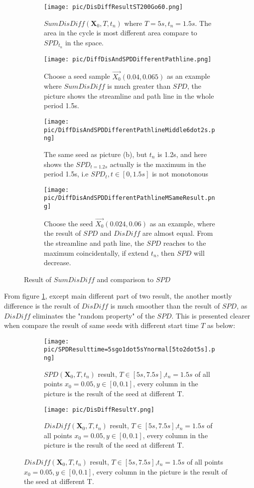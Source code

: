 \documentclass[
     11pt,         %
     a4paper,      %
     oneside,
     ]{article}
\newcommand{\vect}[1]{\boldsymbol{#1}}
\begin{document}
\begin{figure}[H]
	\centering
	\begin{subfigure}{0.65\textwidth}
		\centering
		\texttt{[image: pic/DisDiffResultST200Go60.png]}
		\caption{$SumDisDiff(\vect{X}_{0},T,t_{n})$ where $T=5s, t_{n}=1.5s $. The area in the cycle is most different area compare to $SPD_{t_{n}}$ in the space.  }
	\end{subfigure}
	\begin{subfigure}{0.45\textwidth}
		\centering
		\texttt{[image: pic/DiffDisAndSPDDifferentPathline.png]}
		\caption{Choose a seed sample $\vec{X_{0}}(0.04,0.065)$  as an example where  $SumDisDiff$ is much greater than $SPD$, the picture shows the streamline and path line in the whole period 1.5s. }
	\end{subfigure}	
	\begin{subfigure}{0.45\textwidth}
			\centering
			\texttt{[image: pic/DiffDisAndSPDDifferentPathlineMiddle6dot2s.png]}
			\caption{The same seed as picture (b), but $t_{n}$ is 1.2s, and here shows the $SPD_{t=1.2s}$ actually is the maximum in the period 1.5s, i.e $SPD_{t}, t\in[0, 1.5s]$ is not monotonous}
	\end{subfigure}		
	\begin{subfigure}{0.55\textwidth}
			\centering
			\texttt{[image: pic/DiffDisAndSPDDifferentPathlineMSameResult.png]}
			\caption{Choose the seed $\vec{X_{0}}(0.024,0.06)$ as an example, where the result of $SPD$ and $DisDiff$ are almost equal. From the streamline and path line, the $SPD$ reaches to the maximum coincidentally, if extend $t_{n}$, then $SPD$ will decrease.}
	\end{subfigure}	
	\caption{Result of $SumDisDiff$ and comparison to $SPD$}
	\label{fig:ResultofSumDisDiff}			
\end{figure}
From figure \ref{fig:ResultofSumDisDiff}, except main different part of two result, the another mostly difference is the result of $DisDiff$ is much smoother than the result of $SPD$, as $DisDiff$ eliminates the "random property" of the $SPD$. This is presented clearer when compare the result of same seeds with different start time $T$ as below:
\begin{figure}[H]
	\centering
	\begin{subfigure}{0.45\textwidth}
		\centering
		\texttt{[image: pic/SPDResulttime=5sgo1dot5sYnormal[5to2dot5s].png]}
		\caption{ $SPD(\vect{X}_{0},T,t_{n})$ result, $T\in[5s,7.5s]$,$t_{n}=1.5s$ of all points $x_{0}=0.05,y\in[0,0.1]$, every column in the picture is the result of the seed at different T.}
	\end{subfigure}
	\begin{subfigure}{0.45\textwidth}
		\centering
		\texttt{[image: pic/DisDiffResultY.png]}
		\caption{$DisDiff(\vect{X}_{0},T,t_{n})$ result, $T\in[5s,7.5s]$,$t_{n}=1.5s$ of all points $x_{0}=0.05,y\in[0,0.1]$, every column in the picture is the result of the seed at different T. }
	\end{subfigure}	
		\label{fig:ResultofSumDisDiffY}			
\end{figure}	
\end{document}
